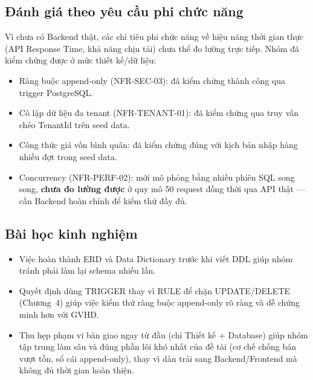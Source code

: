 \subsection{Đánh giá theo yêu cầu phi chức năng}
Vì chưa có Backend thật, các chỉ tiêu phi chức năng về hiệu năng thời gian thực (API Response Time, khả năng chịu tải) chưa thể đo lường trực tiếp. Nhóm đã kiểm chứng được ở mức thiết kế/dữ liệu:
\begin{itemize}
    \item Ràng buộc append-only (NFR-SEC-03): đã kiểm chứng thành công qua trigger PostgreSQL.
    \item Cô lập dữ liệu đa tenant (NFR-TENANT-01): đã kiểm chứng qua truy vấn chéo TenantId trên seed data.
    \item Công thức giá vốn bình quân: đã kiểm chứng đúng với kịch bản nhập hàng nhiều đợt trong seed data.
    \item Concurrency (NFR-PERF-02): mới mô phỏng bằng nhiều phiên SQL song song, \textbf{chưa đo lường được} ở quy mô 50 request đồng thời qua API thật — cần Backend hoàn chỉnh để kiểm thử đầy đủ.
\end{itemize}

\subsection{Bài học kinh nghiệm}
\begin{itemize}
    \item Việc hoàn thành ERD và Data Dictionary trước khi viết DDL giúp nhóm tránh phải làm lại schema nhiều lần.
    \item Quyết định dùng TRIGGER thay vì RULE để chặn UPDATE/DELETE (Chương~4) giúp việc kiểm thử ràng buộc append-only rõ ràng và dễ chứng minh hơn với GVHD.
    \item Thu hẹp phạm vi bàn giao ngay từ đầu (chỉ Thiết kế + Database) giúp nhóm tập trung làm sâu và đúng phần lõi khó nhất của đề tài (cơ chế chống bán vượt tồn, sổ cái append-only), thay vì dàn trải sang Backend/Frontend mà không đủ thời gian hoàn thiện.
\end{itemize}
